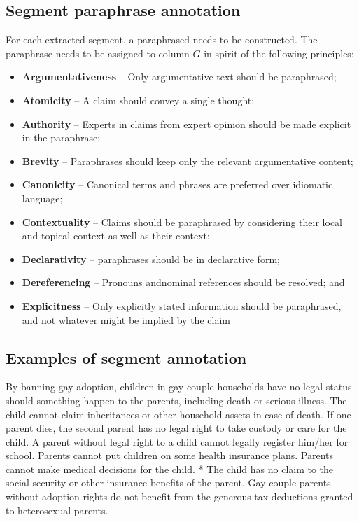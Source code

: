 \subsection{Segment paraphrase annotation}

For each extracted segment, a paraphrased needs to be constructed. The paraphrase needs to
be assigned to column $G$ in spirit of the following principles:
\begin{itemize}
\item \textbf{Argumentativeness} -- Only argumentative text should be paraphrased; 
\item \textbf{Atomicity} -- A claim should convey a single thought; 
\item \textbf{Authority} -- Experts in claims from expert opinion should be made explicit in the paraphrase; 
\item \textbf{Brevity} -- Paraphrases should keep only the relevant argumentative content; 
\item \textbf{Canonicity} -- Canonical terms and phrases are preferred over idiomatic language;
\item \textbf{Contextuality} -- Claims should be paraphrased by considering their local and
topical context as well as their context;
\item \textbf{Declarativity} -- paraphrases should 
be in declarative form;
\item \textbf{Dereferencing} -- Pronouns andnominal  references
should be  resolved;  and
\item \textbf{Explicitness} -- Only explicitly stated
information should be paraphrased, and not whatever might be implied by the claim
\end{itemize}

\subsection{Examples of segment annotation}

\begin{mydef}
By banning gay adoption, children in gay couple households have no legal status
should something happen to the parents, including death or serious illness.
The child cannot claim inheritances or other household assets in case of death.
If one parent dies, the second parent has no legal right to take custody or
care for the child.   A parent without legal right to a child cannot legally
register him/her for school.   Parents cannot put children on some health
insurance plans.   Parents cannot make medical decisions for the child.   * The
child has no claim to the social security or other insurance benefits of the
parent.   Gay couple parents without adoption rights do not benefit from the
generous tax deductions granted to heterosexual parents.
\end{mydef}

